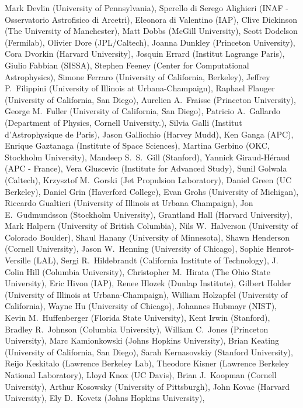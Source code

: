 Mark Devlin (University of Pennsylvania),
Sperello di Serego Alighieri (INAF - Osservatorio Astrofisico di Arcetri),
Eleonora di Valentino (IAP),
Clive Dickinson (The University of Manchester),
Matt Dobbs (McGill University),
Scott Dodelson (Fermilab),
Olivier Dore (JPL/Caltech),
Joanna Dunkley (Princeton University),
Cora Dvorkin (Harvard University),
Josquin Errard (Institut Lagrange Paris),
Giulio Fabbian (SISSA),
Stephen Feeney (Center for Computational Astrophysics),
Simone Ferraro (University of California, Berkeley),
Jeffrey P.~Filippini (University of Illinois at Urbana-Champaign),
Raphael Flauger (University of California, San Diego),
Aurelien A.~Fraisse (Princeton University),
George M.~Fuller (University of California, San Diego),
Patricio A.~Gallardo (Department of Physics, Cornell University.),
Silvia Galli (Institut d'Astrophysique de Paris),
Jason Gallicchio (Harvey Mudd),
Ken Ganga (APC),
Enrique Gaztanaga (Institute of Space Sciences),
Martina Gerbino (OKC, Stockholm University),
Mandeep S.~S.~Gill (Stanford),
Yannick Giraud-Héraud (APC - France),
Vera Gluscevic (Institute for Advanced Study),
Sunil Golwala (Caltech),
Krzysztof M.~Gorski (Jet Propulsion Laboratory),
Daniel Green (UC Berkeley),
Daniel Grin (Haverford College),
Evan Grohs (University of Michigan),
Riccardo Gualtieri (University of Illinois at Urbana Champaign),
Jon E.~Gudmundsson (Stockholm University),
Grantland Hall (Harvard University),
Mark Halpern (University of British Columbia),
Nils W.~Halverson (University of Colorado Boulder),
Shaul Hanany (University of Minnesota),
Shawn Henderson (Cornell University),
Jason W.~Henning (University of Chicago),
Sophie Henrot-Versille (LAL),
Sergi R.~Hildebrandt (California Institute of Technology),
J. Colin Hill (Columbia University),
Christopher M.~Hirata (The Ohio State University),
Eric Hivon (IAP),
Renee Hlozek (Dunlap Institute),
Gilbert Holder (University of Illinois at Urbana-Champaign),
William Holzapfel (University of California),
Wayne Hu (University of Chicago),
Johannes Hubmayr (NIST),
Kevin M.~Huffenberger (Florida State University),
Kent Irwin (Stanford),
Bradley R.~Johnson (Columbia University),
William C.~Jones (Princeton University),
Marc Kamionkowski (Johns Hopkins University),
Brian Keating (University of California, San Diego),
Sarah Kernasovskiy (Stanford University),
Reijo Keskitalo (Lawrence Berkeley Lab),
Theodore Kisner (Lawrence Berkeley National Laboratory),
Lloyd Knox (UC Davis),
Brian J.~Koopman (Cornell University),
Arthur Kosowsky (University of Pittsburgh),
John Kovac (Harvard University),
Ely D.~Kovetz (Johns Hopkins University),
